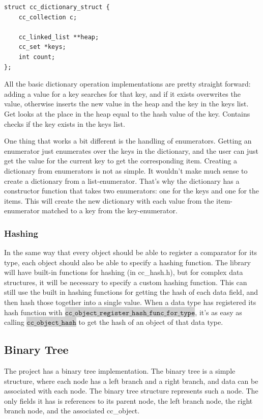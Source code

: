 \documentclass[table]{ituthesis}
\newcommand{\highlight}[1]{\colorbox{lightGray}{$\displaystyle \texttt{#1}$}}
\begin{document}
\begin{lstlisting}[label=cc_dictionary-struct,caption=Internal representation of Dictionary]
struct cc_dictionary_struct {
	cc_collection c;
	
	cc_linked_list **heap;
	cc_set *keys;
	int count;
};
\end{lstlisting}

	All the basic dictionary operation implementations are pretty straight forward: adding a value for a key searches for that key, and if it exists overwrites the value, otherwise inserts the new value in the heap and the key in the keys list. Get looks at the place in the heap equal to the hash value of the key. Contains checks if the key exists in the keys list.

	One thing that works a bit different is the handling of enumerators. Getting an enumerator just enumerates over the keys in the dictionary, and the user can just get the value for the current key to get the corresponding item. Creating a dictionary from enumerators is not as simple. It wouldn't make much sense to create a dictionary from a list-enumerator. That's why the dictionary has a constructor function that takes two enumerators: one for the keys and one for the items. This will create the new dictionary with each value from the item-enumerator matched to a key from the key-enumerator.
	
	\subsubsection{Hashing}
	
	In the same way that every object should be able to register a comparator for its type, each object should also be able to specify a hashing function. The library will have built-in functions for hashing (in cc\_hash.h), but for complex data structures, it will be necessary to specify a custom hashing function. This can still use the built in hashing functions for getting the hash of each data field, and then hash those together into a single value. When a data type has registered its hash function with \highlight{cc\_object\_register\_hash\_func\_for\_type}, it's as easy as calling \highlight{cc\_object\_hash} to get the hash of an object of that data type.
	
	\subsection{Binary Tree}
	
	The project has a binary tree implementation. The binary tree is a simple structure, where each node has a left branch and a right branch, and data can be associated with each node. The binary tree structure represents such a node. The only fields it has is references to its parent node, the left branch node, the right branch node, and the associated cc\_object.
\end{document}
